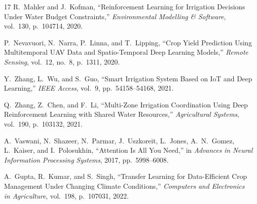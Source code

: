 \documentclass[12pt, a4paper]{article}
\begin{document}
\begin{thebibliography}{17}
R.~Mahler and J.~Kofman, ``Reinforcement Learning for Irrigation Decisions Under Water Budget Constraints,'' \textit{Environmental Modelling \& Software}, vol.~130, p.~104714, 2020.

P.~Nevavuori, N.~Narra, P.~Linna, and T.~Lipping, ``Crop Yield Prediction Using Multitemporal UAV Data and Spatio-Temporal Deep Learning Models,'' \textit{Remote Sensing}, vol.~12, no.~8, p.~1311, 2020.

Y.~Zhang, L.~Wu, and S.~Guo, ``Smart Irrigation System Based on IoT and Deep Learning,'' \textit{IEEE Access}, vol.~9, pp.~54158--54168, 2021.

Q.~Zhang, Z.~Chen, and F.~Li, ``Multi-Zone Irrigation Coordination Using Deep Reinforcement Learning with Shared Water Resources,'' \textit{Agricultural Systems}, vol.~190, p.~103132, 2021.

A.~Vaswani, N.~Shazeer, N.~Parmar, J.~Uszkoreit, L.~Jones, A.~N.~Gomez, L.~Kaiser, and I.~Polosukhin, ``Attention Is All You Need,'' in \textit{Advances in Neural Information Processing Systems}, 2017, pp.~5998--6008.

A.~Gupta, R.~Kumar, and S.~Singh, ``Transfer Learning for Data-Efficient Crop Management Under Changing Climate Conditions,'' \textit{Computers and Electronics in Agriculture}, vol.~198, p.~107031, 2022.

\end{thebibliography}
\end{document}
